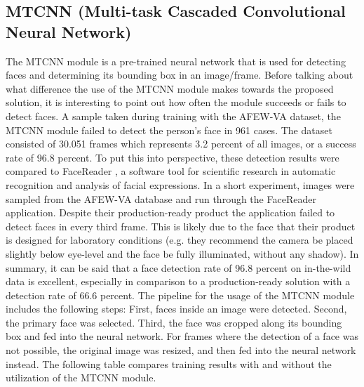 \subsection{MTCNN (Multi-task Cascaded Convolutional Neural Network)}
The MTCNN module is a pre-trained neural network that is used for detecting faces and determining its bounding box in an image/frame. Before talking about what difference the use of the MTCNN module makes towards the proposed solution, it is interesting to point out how often the module succeeds or fails to detect faces.
\newline\newline
A sample taken during training with the AFEW-VA dataset, the MTCNN module failed to detect the person's face in 961 cases. The dataset consisted of 30.051 frames which represents 3.2 percent of all images, or a success rate of 96.8 percent. To put this into perspective, these detection results were compared to FaceReader \citep{Noldus:2020:Facereader}, a software tool for scientific research in automatic recognition and analysis of facial expressions.
\newline\newline
In a short experiment, images were sampled from the AFEW-VA database and run through the FaceReader application. Despite their production-ready product the application failed to detect faces in every third frame. This is likely due to the face that their product is designed for laboratory conditions (e.g. they recommend the camera be placed slightly below eye-level and the face be fully illuminated, without any shadow). In summary, it can be said that a face detection rate of 96.8 percent on in-the-wild data is excellent, especially in comparison to a production-ready solution with a detection rate of 66.6 percent.
\newline\newline
The pipeline for the usage of the MTCNN module includes the following steps: First, faces inside an image were detected. Second, the primary face was selected. Third, the face was cropped along its bounding box and fed into the neural network. For frames where the detection of a face was not possible, the original image was resized, and then fed into the neural network instead. The following table compares training results with and without the utilization of the MTCNN module. 

